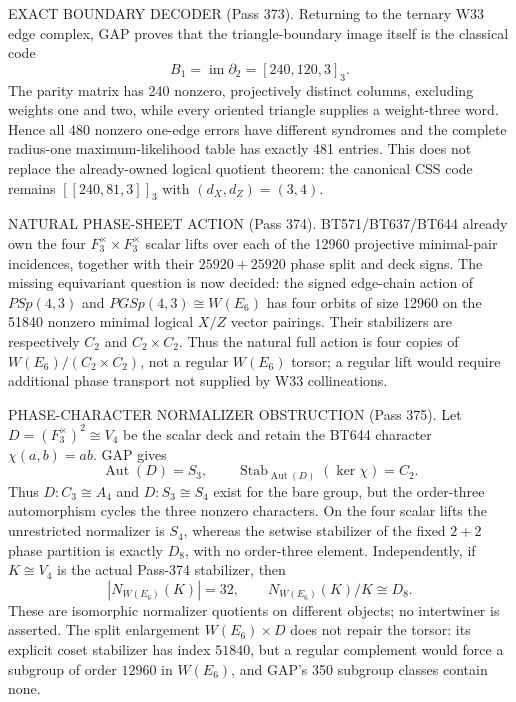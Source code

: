 \documentclass[12pt,a4paper]{article}
\def\mathbb#1{#1}%
\def\textbf#1{#1}%
\theoremstyle{definition}
\begin{document}
\begin{center}
{{\smallskip
\textbf{EXACT BOUNDARY DECODER (Pass 373).}  Returning to the ternary W33
edge complex, GAP proves that the triangle-boundary image itself is the
classical code
\[
 B_1=\operatorname{im}\partial_2=[240,120,3]_3.
\]
The parity matrix has 240 nonzero, projectively distinct columns, excluding
weights one and two, while every oriented triangle supplies a weight-three
word.  Hence all 480 nonzero one-edge errors have different syndromes and the
complete radius-one maximum-likelihood table has exactly 481 entries.  This
does not replace the already-owned logical quotient theorem: the canonical CSS
code remains $[[240,81,3]]_3$ with $(d_X,d_Z)=(3,4)$.

\smallskip
\textbf{NATURAL PHASE-SHEET ACTION (Pass 374).}  BT571/BT637/BT644 already
own the four $\mathbb F_3^\times\!\times\mathbb F_3^\times$ scalar lifts over
each of the 12960 projective minimal-pair incidences, together with their
$25920+25920$ phase split and deck signs.  The missing equivariant question is
now decided: the signed edge-chain action of $PSp(4,3)$ and
$PGSp(4,3)\cong W(E_6)$ has four orbits of size 12960 on the 51840 nonzero
minimal logical $X/Z$ vector pairings.  Their stabilizers are respectively
$C_2$ and $C_2\times C_2$.  Thus the natural full action is four copies of
$W(E_6)/(C_2\times C_2)$, not a regular $W(E_6)$ torsor; a regular lift would
require additional phase transport not supplied by W33 collineations.

\smallskip
\textbf{PHASE-CHARACTER NORMALIZER OBSTRUCTION (Pass 375).}  Let
$D=(\mathbb F_3^\times)^2\cong V_4$ be the scalar deck and retain the
BT644 character $\chi(a,b)=ab$.  GAP gives
\[
 \operatorname{Aut}(D)=S_3,
 \qquad \operatorname{Stab}_{\operatorname{Aut}(D)}(\ker\chi)=C_2.
\]
Thus $D{:}C_3\cong A_4$ and $D{:}S_3\cong S_4$ exist for the bare group,
but the order-three automorphism cycles the three nonzero characters.  On the
four scalar lifts the unrestricted normalizer is $S_4$, whereas the setwise
stabilizer of the fixed $2+2$ phase partition is exactly $D_8$, with no
order-three element.  Independently, if $K\cong V_4$ is the actual Pass-374
stabilizer, then
\[
 |N_{W(E_6)}(K)|=32,
 \qquad N_{W(E_6)}(K)/K\cong D_8.
\]
These are isomorphic normalizer quotients on different objects; no intertwiner
is asserted.  The split enlargement $W(E_6)\times D$ does not repair the
torsor: its explicit coset stabilizer has index $51840$, but a regular
complement would force a subgroup of order $12960$ in $W(E_6)$, and GAP's 350
subgroup classes contain none.

}}
\end{center}
\end{document}
